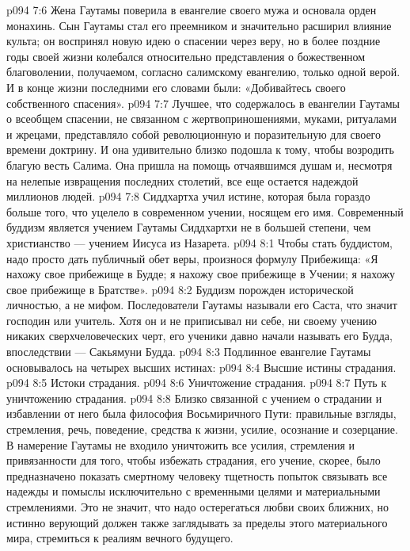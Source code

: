 \vs p094 7:6 Жена Гаутамы поверила в евангелие своего мужа и основала орден монахинь. Сын Гаутамы стал его преемником и значительно расширил влияние культа; он воспринял новую идею о спасении через веру, но в более поздние годы своей жизни колебался относительно представления о божественном благоволении, получаемом, согласно салимскому евангелию, только одной верой. И в конце жизни последними его словами были: «Добивайтесь своего собственного спасения».
\vs p094 7:7 \pc Лучшее, что содержалось в евангелии Гаутамы о всеобщем спасении, не связанном с жертвоприношениями, муками, ритуалами и жрецами, представляло собой революционную и поразительную для своего времени доктрину. И она удивительно близко подошла к тому, чтобы возродить благую весть Салима. Она пришла на помощь отчаявшимся душам и, несмотря на нелепые извращения последних столетий, все еще остается надеждой миллионов людей.
\vs p094 7:8 Сиддхартха учил истине, которая была гораздо больше того, что уцелело в современном учении, носящем его имя. Современный буддизм является учением Гаутамы Сиддхартхи не в большей степени, чем христианство --- учением Иисуса из Назарета.
\vs p094 8:1 Чтобы стать буддистом, надо просто дать публичный обет веры, произнося формулу Прибежища: «Я нахожу свое прибежище в Будде; я нахожу свое прибежище в Учении; я нахожу свое прибежище в Братстве».
\vs p094 8:2 Буддизм порожден исторической личностью, а не мифом. Последователи Гаутамы называли его Саста, что значит господин или учитель. Хотя он и не приписывал ни себе, ни своему учению никаких сверхчеловеческих черт, его ученики давно начали называть его  Будда, впоследствии --- Сакьямуни Будда.
\vs p094 8:3 \pc Подлинное евангелие Гаутамы основывалось на четырех высших истинах:
\vs p094 8:4 \bibnobreakspace Высшие истины страдания.
\vs p094 8:5 \bibnobreakspace Истоки страдания.
\vs p094 8:6 \bibnobreakspace Уничтожение страдания.
\vs p094 8:7 \bibnobreakspace Путь к уничтожению страдания.
\vs p094 8:8 \pc Близко связанной с учением о страдании и избавлении от него была философия Восьмиричного Пути: правильные взгляды, стремления, речь, поведение, средства к жизни, усилие, осознание и созерцание. В намерение Гаутамы не входило уничтожить все усилия, стремления и привязанности для того, чтобы избежать страдания, его учение, скорее, было предназначено показать смертному человеку тщетность попыток связывать все надежды и помыслы исключительно с временными целями и материальными стремлениями. Это не значит, что надо остерегаться любви своих ближних, но истинно верующий должен также заглядывать за пределы этого материального мира, стремиться к реалиям вечного будущего.
